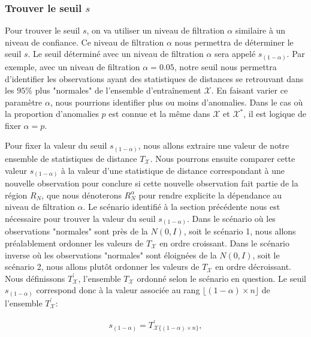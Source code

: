 \subsubsection{Trouver le seuil $s$}

 Pour trouver le seuil $s$, on va utiliser un niveau de filtration $\alpha$ similaire à un niveau de confiance. Ce niveau de filtration $\alpha$ nous permettra de déterminer le seuil $s$. Le seuil déterminé avec un niveau de filtration $\alpha$ sera appelé $s_{(1-\alpha)}$. Par exemple, avec un niveau de filtration $\alpha=0.05$, notre seuil \DIFdelbegin {}\DIFdelend \DIFaddbegin {}\DIFaddend nous permettra d'identifier les observations ayant des statistiques de distances se retrouvant dans les $95\%$ plus "normales" de l'ensemble d'entraînement $\mathcal{X}$. En faisant varier ce paramètre $\alpha$, nous pourrions identifier plus ou moins d'anomalies. Dans le cas où la proportion d'anomalies $p$ est connue et la même dans  $\mathcal{X}$ et $\mathcal{X}^*$, il est logique de fixer $\alpha=p$.

Pour fixer la valeur du  seuil $s_{(1-\alpha)}$, nous allons extraire une valeur de notre ensemble de statistiques de distance $T_{\mathcal{X}}$. Nous pourrons ensuite comparer cette valeur $s_{(1-\alpha)}$ à la valeur d'une statistique de distance  correspondant à une nouvelle observation pour conclure si cette nouvelle observation fait partie de la région $R_N$, que nous dénoterons $R_{N}^{\alpha}$ pour rendre explicite la dépendance au niveau de filtration $\alpha$. Le scénario identifié à la section précédente nous est nécessaire pour trouver la valeur du seuil $s_{(1-\alpha)}$. Dans le scénario où les observations "normales" sont près de la $N(0,I)$, soit le scénario 1, nous allons préalablement ordonner les valeurs de $T_{\mathcal{X}}$ en ordre croissant. Dans le scénario inverse où les observations "normales" sont éloignées de la $N(0,I)$, soit le scénario 2, nous allons plutôt ordonner les valeurs de $T_{\mathcal{X}}$ en ordre décroissant. Nous définissons $T^{'}_{\mathcal{X}}$, l'ensemble $T_{\mathcal{X}}$ ordonné selon le scénario en question. Le seuil $s_{(1-\alpha)}$ correspond donc à la valeur associée au rang $\lfloor(1 - \alpha) \times n\rfloor$ de l'ensemble $T^{'}_{\mathcal{X}}$:

\begin{gather*} \label{eq:seuil}
s_{(1 - \alpha)} = T^{'}_{\mathcal{X} \{(1 - \alpha) \times n\}},
\end{gather*}

